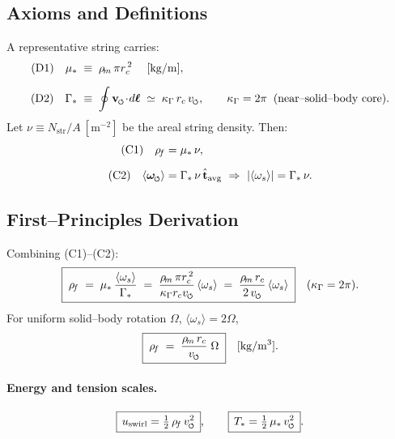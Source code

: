 \documentclass[11pt]{article}
\begin{document}
    \subsection{Axioms and Definitions}
    A representative string carries:
    \begin{align}
        \text{(D1)}\quad
        \mu_\ast &\;\equiv\; \rhom\,\pi \rc^{\,2}
        \quad\;[\mathrm{kg/m}], \\[2mm]
        \text{(D2)}\quad
        \Gamma_\ast &\;\equiv\; \oint \vswirl\!\cdot\! d\boldsymbol{\ell}
        \;\simeq\; \kappa_\Gamma\, \rc\, \vscore,
        \qquad \kappa_\Gamma=2\pi \;\; \text{(near–solid–body core)}.
    \end{align}
    Let
    \(
    \nu \equiv N_{\text{str}}/A \ [\mathrm{m^{-2}}]
    \)
    be the areal string density. Then:
    \begin{align}
        \text{(C1)}\quad
        \rhof &= \mu_\ast\,\nu, \\[2mm]
        \text{(C2)}\quad
        \langle \omegas\rangle &= \Gamma_\ast\,\nu\,\hat{\mathbf{t}}_{\text{avg}}
        \ \Rightarrow\  |\langle\omega_s\rangle|=\Gamma_\ast\,\nu.
    \end{align}

    \subsection{First–Principles Derivation}
    Combining (C1)–(C2):
    \begin{equation}
        \boxed{\;
        \rhof
        \;=\; \mu_\ast\,\frac{\langle\omega_s\rangle}{\Gamma_\ast}
        \;=\; \frac{\rhom\,\pi \rc^{\,2}}{\kappa_\Gamma \rc \vscore}\,\langle\omega_s\rangle
        \;=\; \frac{\rhom\,\rc}{2\,\vscore}\,\langle\omega_s\rangle
        \;}
        \quad (\kappa_\Gamma=2\pi).
        \label{eq:rhof_from_omega}
    \end{equation}
    For uniform solid–body rotation \(\Omega\), \(\langle\omega_s\rangle=2\Omega\),
    \begin{equation}
        \boxed{\;
        \rhof
        \;=\; \frac{\rhom\,\rc}{\vscore}\;\Omega
        \;}
        \quad [\mathrm{kg/m^3}].
        \label{eq:rhof_from_Omega}
    \end{equation}

    \paragraph{Energy and tension scales.}
    \[
        \boxed{\, u_{\text{swirl}}=\tfrac12\,\rhof\,\vscore^2 \,},\qquad
        \boxed{\, T_\ast = \tfrac12\,\mu_\ast\,\vscore^2 \,}.
    \]
\end{document}
